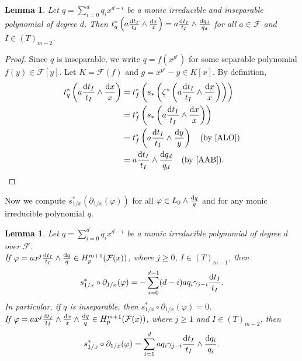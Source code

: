 \documentclass[times,10pt]{amsart}
\newcommand{\dd}{{\rm d}}
\newcommand{\F}{\ensuremath{\mathcal{F}}}
\renewcommand{\phi}{\varphi}
\newtheorem{lemma}[thm]{Lemma}%
\begin{document}
 \begin{lemma}\label{l83} Let $q=\sum_{i=0}^{d}q_ix^{d-i}$ be a monic irreducible and inseparable polynomial  of degree $d$.   Then ${t_q^*\left( a\frac{\dd t_I}{t_I}\wedge \frac{\dd x}{x}\right)= a\frac{\dd t_I}{t_I}\wedge \frac{\dd q_d}{q_d}}$ for all $a\in \F$ and $I\in (T)_{m-2}$.\end{lemma}
\begin{proof}
     Since $q$ is inseparable, we write $q= f(x^{p^r})$ for some separable polynomial $f(y)\in \F[y]$. Let $K= \F(f)$ and $g= x^{p^r}-{y}\in K[x]$.    By definition, \begin{align*}
         t_q^*\left( a\frac{\dd t_I}{t_I}\wedge \frac{\dd x}{x}\right) &=  t_f^*\left( s_*\left(\zeta^*\left(  a\frac{\dd t_I}{t_I}\wedge \frac{\dd x}{x}\right)\right)\right)\\&= t_f^*\left(s_*\left(  a\frac{\dd t_I}{t_I}\wedge \frac{\dd x}{x}\right)\right)\\&=  t_f^*\left( a\frac{\dd t_I}{t_I}\wedge \frac{\dd {y}}{{y}}\right)\quad \text{(by \cite[Proposition 3.4, (ii)]{ALO})} \\&= a\frac{\dd t_I}{t_I}\wedge \frac{\dd q_d}{q_d}\quad \text{(by \cite[Lemma 2.5, Proposition 2.4]{AAB})}.  \end{align*}\end{proof}
    Now we  compute $s^*_{1/x}(\partial_{1/x}(\phi))$ for all $\phi\in L_0\wedge \frac{\dd q}{q}$  and for any monic irreducible polynomial $q$.
\begin{lemma}\label{l84}
    Let $q=\sum_{i=0}^{d} q_ix^{d-i}$ be a monic   irreducible polynomial of degree $d$ over $\F$. \\
  If $\phi= ax^j\frac{\dd t_I}{t_I}\wedge \frac{\dd q}{q}\in H_p^{m+1}(\F(x))$, where $j\geq 0$, $I\in (T)_{m-1}$, then $$s^*_{1/x}\circ \partial_{1/x}(\phi)= -\sum_{i=0}^{d-1}(d-i) aq_i\gamma_{j-i}\frac{\dd t_I}{t_I} .$$ In particular,   if $q$ is inseparable,  then $s^*_{1/x}\circ \partial_{1/x}(\phi)=0$.\\
 
  If $\phi= ax^j\frac{\dd t_I}{t_I}\wedge \frac{\dd x}{x}\wedge \frac{\dd q}{q}\in H_p^{m+1}(\F(x))$, where $j\geq 1$ and $I\in (T)_{m-2}$, then  $$  s^*_{1/x}\circ \partial_{1/x}(\phi)= \sum_{i=1}^{d} aq_i \gamma_{j-i} \frac{\dd t_I}{t_I}\wedge \frac{\dd q_i}{q_i}.$$
\end{lemma}
\end{document}
